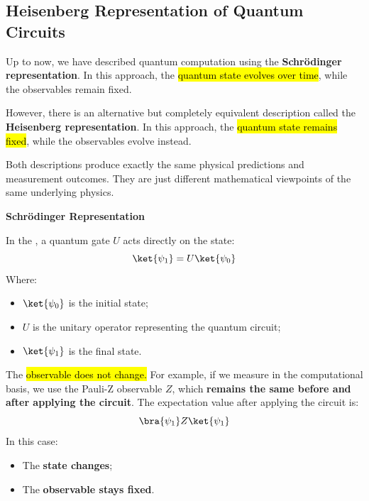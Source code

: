 \subsection{Heisenberg Representation of Quantum Circuits}

Up to now, we have described quantum computation using the \textbf{Schrödinger representation}. In this approach, the \hl{quantum state evolves over time}, while the observables remain fixed.

\highspace
However, there is an alternative but completely equivalent description called the \textbf{Heisenberg representation}. In this approach, the \hl{quantum state remains fixed}, while the observables evolve instead.

\highspace
Both descriptions produce exactly the same physical predictions and measurement outcomes. They are just different mathematical viewpoints of the same underlying physics.

\highspace
\begin{flushleft}
    \textcolor{Green3}{ \textbf{Schrödinger Representation}}
\end{flushleft}
In the , a quantum gate $U$ acts directly on the state:
\begin{equation}
    \ket{\psi_1}
    =
    U\ket{\psi_0}
\end{equation}
Where:
\begin{itemize}
    \item $\ket{\psi_0}$ is the initial state;
    \item $U$ is the unitary operator representing the quantum circuit;
    \item $\ket{\psi_1}$ is the final state.
\end{itemize}
The \hl{observable does not change.} For example, if we measure in the computational basis, we use the Pauli-Z observable $Z$, which \textbf{remains the same before and after applying the circuit}. The expectation value after applying the circuit is:
\begin{equation*}
    \bra{\psi_1} Z \ket{\psi_1}
\end{equation*}
In this case:
\begin{itemize}
    \item The \textbf{state changes};
    \item The \textbf{observable stays fixed}.
\end{itemize}

